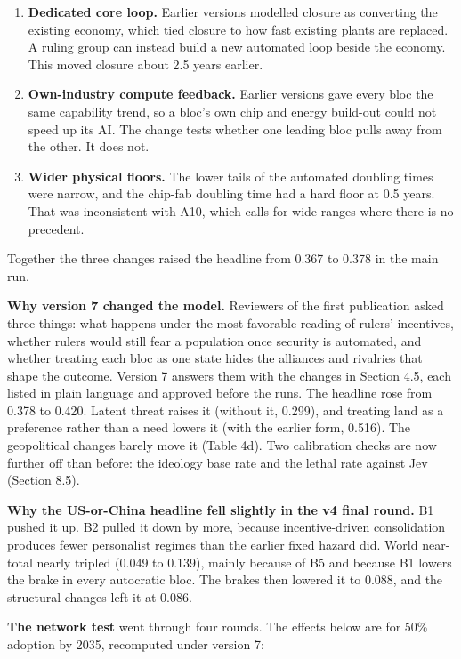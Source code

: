 \documentclass[
  10pt,
]{article}
\providecommand{\tightlist}{%
  \setlength{\itemsep}{0pt}\setlength{\parskip}{0pt}}
\begin{document}
\begin{enumerate}
\def\labelenumi{\arabic{enumi}.}
\tightlist
\item
  \textbf{Dedicated core loop.} Earlier versions modelled closure as converting the existing
  economy, which tied closure to how fast existing plants are replaced. A ruling group can instead
  build a new automated loop beside the economy. This moved closure about 2.5 years earlier.
\item
  \textbf{Own-industry compute feedback.} Earlier versions gave every bloc the same capability
  trend, so a bloc's own chip and energy build-out could not speed up its AI. The change tests
  whether one leading bloc pulls away from the other. It does not.
\item
  \textbf{Wider physical floors.} The lower tails of the automated doubling times were narrow, and
  the chip-fab doubling time had a hard floor at 0.5 years. That was inconsistent with A10, which
  calls for wide ranges where there is no precedent.
\end{enumerate}

Together the three changes raised the headline from 0.367 to 0.378 in the main run.

\textbf{Why version 7 changed the model.} Reviewers of the first publication asked three things:
what happens under the most favorable reading of rulers' incentives, whether rulers would still fear
a population once security is automated, and whether treating each bloc as one state hides the
alliances and rivalries that shape the outcome. Version 7 answers them with the changes in Section
4.5, each listed in plain language and approved before the runs. The headline rose from 0.378 to
0.420. Latent threat raises it (without it, 0.299), and treating land as a preference rather than a
need lowers it (with the earlier form, 0.516). The geopolitical changes barely move it (Table 4d).
Two calibration checks are now further off than before: the ideology base rate and the lethal rate
against Jev (Section 8.5).

\textbf{Why the US-or-China headline fell slightly in the v4 final round.} B1 pushed it up. B2
pulled it down by more, because incentive-driven consolidation produces fewer personalist regimes
than the earlier fixed hazard did. World near-total nearly tripled (0.049 to 0.139), mainly because
of B5 and because B1 lowers the brake in every autocratic bloc. The brakes then lowered it to 0.088,
and the structural changes left it at 0.086.

\textbf{The network test} went through four rounds. The effects below are for 50\% adoption by 2035,
recomputed under version 7:
\end{document}
